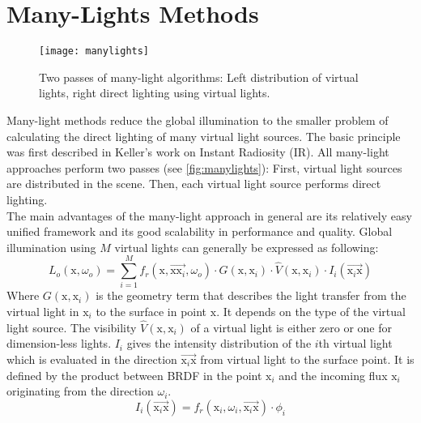 \documentclass[thesis.tex]{subfiles}
\begin{document}
\section {Many-Lights Methods} \label{sec:prev:manylights}
\begin{figure}[h]
	\centering
	\texttt{[image: manylights]}
	\caption{\cite{bib:manylightssurvey2014} Two passes of many-light algorithms: Left distribution of virtual lights, right direct lighting using virtual lights.} \label{fig:manylights}
\end{figure}
Many-light methods reduce the global illumination to the smaller problem of calculating the direct lighting of many virtual light sources.
The basic principle was first described in Keller's work on Instant Radiosity \cite{bib:instantradiosity} (IR).
All many-light approaches perform two passes (see \autoref{fig:manylights}):
First, virtual light sources are distributed in the scene.
Then, each virtual light source performs direct lighting.
\\
The main advantages of the many-light approach in general are its relatively easy unified framework and its good scalability in performance and quality.
Global illumination using $M$ virtual lights can generally be expressed as following:
\begin{equation}
L_o(\mathrm{x}, \omega_o) = \sum\limits_{i=1}^{M} f_r(\mathrm{x}, \overrightarrow{\mathrm{x}\mathrm{x}_i}, \omega_o) \cdot G(\mathrm{x}, \mathrm{x}_i) \cdot \hat{V}(\mathrm{x}, \mathrm{x}_i) \cdot I_i(\overrightarrow{\mathrm{x}_i\mathrm{x}})
\end{equation}
Where $G(\mathrm{x}, \mathrm{x}_i)$ is the geometry term that describes the light transfer from the virtual light in $\mathrm{x}_i$ to the surface in point $\mathrm{x}$.
It depends on the type of the virtual light source.
The visibility $\hat{V}(\mathrm{x}, \mathrm{x}_i)$ of a virtual light is either zero or one for dimension-less lights. %
$I_i$ gives the intensity distribution of the $i$th virtual light which is evaluated in the direction $\overrightarrow{\mathrm{x}_i\mathrm{x}}$ from virtual light to the surface point.
It is defined by the product between BRDF in the point $\mathrm{x}_i$ and the incoming flux $\mathrm{x}_i$ originating from the direction $\omega_i$.
\begin{equation}
I_i(\overrightarrow{\mathrm{x}_i\mathrm{x}}) = f_r(\mathrm{x}_i, \omega_i, \overrightarrow{\mathrm{x}_i\mathrm{x}}) \cdot \phi_i
\end{equation}
 
\end{document}
